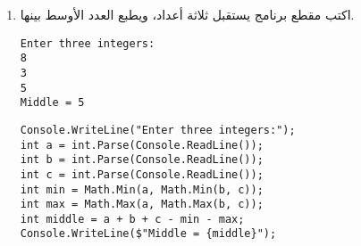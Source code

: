 ﻿\documentclass[12pt]{article}
\begin{document}
\begin{enumerate}[itemsep=3em]
\item
اكتب مقطع برنامج يستقبل ثلاثة أعداد، ويطبع العدد الأوسط بينها.
\ifdetailed
\begin{boxExample}
\begin{english}
\begin{verbatim}
Enter three integers:
8
3
5
Middle = 5
\end{verbatim}
\end{english}
\end{boxExample}
\ifwithsols
\begin{boxSolution}
\begin{english}
\begin{verbatim}
Console.WriteLine("Enter three integers:");
int a = int.Parse(Console.ReadLine());
int b = int.Parse(Console.ReadLine());
int c = int.Parse(Console.ReadLine());
int min = Math.Min(a, Math.Min(b, c));
int max = Math.Max(a, Math.Max(b, c));
int middle = a + b + c - min - max;
Console.WriteLine($"Middle = {middle}");
\end{verbatim}
\end{english}
\end{boxSolution}
\fi
\clearpage
\fi


\end{enumerate}
\end{document}
